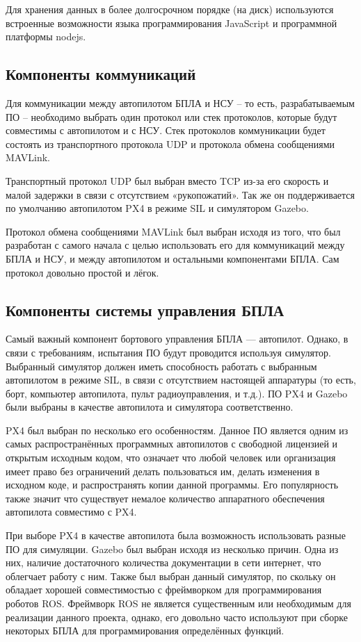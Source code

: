 \documentclass[specification,annotation]{itmo-student-thesis}
\begin{document}
Для хранения данных в более долгосрочном порядке (на диск) используются
встроенные возможности языка программирования JavaScript и программной платформы
nodejs.

\subsection{Компоненты коммуникаций}\label{subsec:commscomps}

Для коммуникации между автопилотом БПЛА и НСУ -- то есть, разрабатываемым ПО --
необходимо выбрать один протокол или стек протоколов, которые будут совместимы
с автопилотом и с НСУ. Стек протоколов коммуникации будет состоять из
транспортного протокола UDP и протокола обмена сообщениями MAVLink.

Транспортный протокол UDP был выбран вместо TCP из-за его скорость и малой
задержки в связи с отсутствием «рукопожатий». Так же он поддерживается по
умолчанию автопилотом PX4 в режиме SIL и симулятором Gazebo.

Протокол обмена сообщениями MAVLink был выбран исходя из того, что был
разработан с самого начала с целью использовать его для коммуникаций между БПЛА
и НСУ, и между автопилотом и остальными компонентами БПЛА. Сам протокол довольно
простой и лёгок.

\subsection{Компоненты системы управления БПЛА}\label{subsec:uavcomps}

Самый важный компонент бортового управления БПЛА --- автопилот. Однако, в связи
с требованиям, испытания ПО будут проводится используя симулятор. Выбранный
симулятор должен иметь способность работать с выбранным автопилотом в режиме
SIL, в связи с отсутствием настоящей аппаратуры (то есть, борт, компьютер
автопилота, пульт радиоуправления, и т.д.). ПО PX4 и Gazebo были выбраны в
качестве автопилота и симулятора соответственно.

PX4 был выбран по несколько его особенностям. Данное ПО является одним из самых
распространённых программных автопилотов с свободной лицензией и открытым
исходным кодом, что означает что любой человек или организация имеет право без
ограничений делать пользоваться им, делать изменения в исходном коде, и
распространять копии данной программы. Его популярность также значит что
существует немалое количество аппаратного обеспечения автопилота совместимо с
PX4.

При выборе PX4 в качестве автопилота была возможность использовать разные ПО для
симуляции. Gazebo был выбран исходя из несколько причин. Одна из них, наличие
достаточного количества документации в сети интернет, что облегчает работу с
ним. Также был выбран данный симулятор, по скольку он обладает хорошей
совместимостью с фреймворком для программирования роботов ROS. Фреймворк ROS не
является существенным или необходимым для реализации данного проекта, однако,
его довольно часто используют при сборке некоторых БПЛА для программирования
определённых функций.
\end{document}
